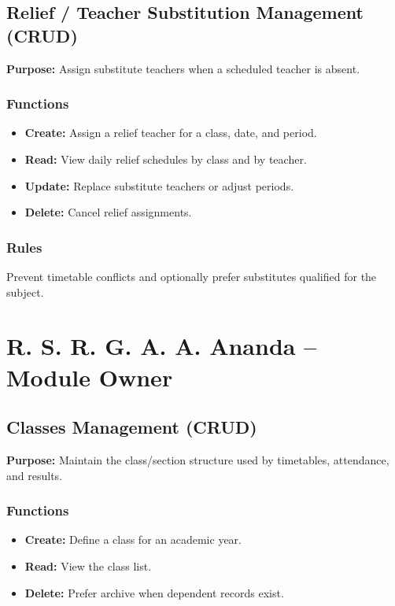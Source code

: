 \documentclass[12pt, a4paper]{report}
\begin{document}
\subsection{Relief / Teacher Substitution Management (CRUD)}
\textbf{Purpose:} Assign substitute teachers when a scheduled teacher is absent.

\subsubsection*{Functions}
\begin{itemize}[leftmargin=*]
  \item \textbf{Create:} Assign a relief teacher for a class, date, and period.
  \item \textbf{Read:} View daily relief schedules by class and by teacher.
  \item \textbf{Update:} Replace substitute teachers or adjust periods.
  \item \textbf{Delete:} Cancel relief assignments.
\end{itemize}

\subsubsection*{Rules}
Prevent timetable conflicts and optionally prefer substitutes qualified for the subject.

\section{R. S. R. G. A. A. Ananda -- Module Owner}

\subsection{Classes Management (CRUD)}
\textbf{Purpose:} Maintain the class/section structure used by timetables, attendance, and results.

\subsubsection*{Functions}
\begin{itemize}[leftmargin=*]
  \item \textbf{Create:} Define a class for an academic year.
  \item \textbf{Read:} View the class list.
  \item \textbf{Delete:} Prefer archive when dependent records exist.
\end{itemize}
\end{document}
